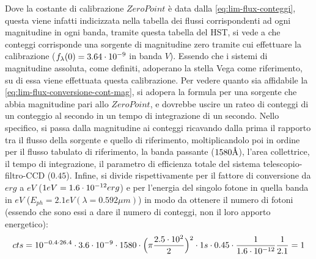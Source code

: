 \begin{exmp}
	Dove la costante di calibrazione $ZeroPoint$ è data dalla \ref{eq:lim-flux-conteggi}, questa viene infatti indicizzata nella tabella dei flussi corrispondenti ad ogni magnitudine in ogni banda, tramite questa tabella del HST, si vede a che conteggi corrisponde una sorgente di magnitudine zero tramite cui effettuare la calibrazione ($f_\lambda(0)=3.64\cdot 10^{-9}$ in banda $V$). Essendo che i sistemi di magnitudine assoluta, come definiti, adoperano la stella Vega come riferimento, su di essa viene effettuata questa calibrazione. Per vedere quanto sia affidabile la \ref{eq:lim-flux-conversione-cont-mag}, si adopera la formula per una sorgente che abbia magnitudine pari allo $ZeroPoint$, e dovrebbe uscire un rateo di conteggi di un conteggio al secondo in un tempo di integrazione di un secondo. Nello specifico, si passa dalla magnitudine ai conteggi ricavando dalla prima il rapporto tra il flusso della sorgente e quello di riferimento, moltiplicandolo poi in ordine per il flusso tabulato di riferimento, la banda passante ($1580\mbox{\normalfont\AA}$), l'area collettrice, il tempo di integrazione, il parametro di efficienza totale del sistema telescopio-filtro-CCD ($0.45$). Infine, si divide rispettivamente per il fattore di conversione da $erg$ a $eV$ ($1eV=1.6\cdot 10^{-12}erg$) e per l'energia del singolo fotone in quella banda in $eV$ ($E_{ph}=2.1eV(\lambda=0.592\mu m)$) in modo da ottenere il numero di fotoni (essendo che sono essi a dare il numero di conteggi, non il loro apporto energetico):
	\begin{equation*}
		cts=10^{-0.4 \cdot 26.4} \cdot 3.6\cdot 10^{-9} \cdot 1580 \cdot \Bigl( \pi\frac{2.5 \cdot 10^2}{2} \Bigr)^2 \cdot 1s \cdot 0.45 \cdot \frac{1}{1.6\cdot 10^{-12}} \frac{1}{2.1}=1
	\end{equation*}
\end{exmp}
